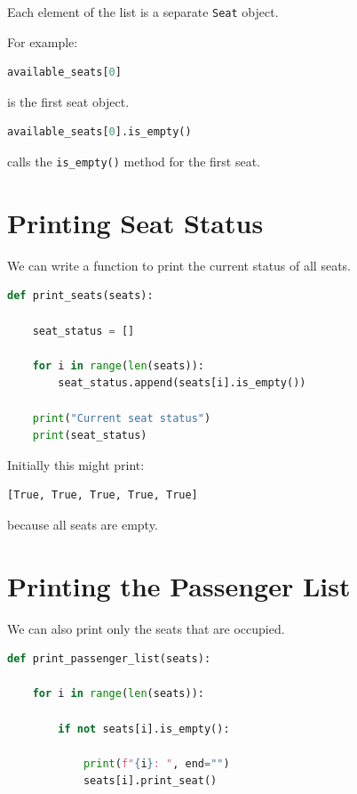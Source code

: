 \documentclass[11pt]{article}
\begin{document}
Each element of the list is a separate \texttt{Seat} object.

For example:

\begin{lstlisting}[language=Python]
available_seats[0]
\end{lstlisting}

is the first seat object.

\begin{lstlisting}[language=Python]
available_seats[0].is_empty()
\end{lstlisting}

calls the \texttt{is\_empty()} method for the first seat.

\section{Printing Seat Status}

We can write a function to print the current status of all seats.

\begin{lstlisting}[language=Python]
def print_seats(seats):

    seat_status = []

    for i in range(len(seats)):
        seat_status.append(seats[i].is_empty())

    print("Current seat status")
    print(seat_status)
\end{lstlisting}

Initially this might print:

\begin{lstlisting}
[True, True, True, True, True]
\end{lstlisting}

because all seats are empty.

\section{Printing the Passenger List}

We can also print only the seats that are occupied.

\begin{lstlisting}[language=Python]
def print_passenger_list(seats):

    for i in range(len(seats)):

        if not seats[i].is_empty():

            print(f"{i}: ", end="")
            seats[i].print_seat()
\end{lstlisting}
\end{document}
